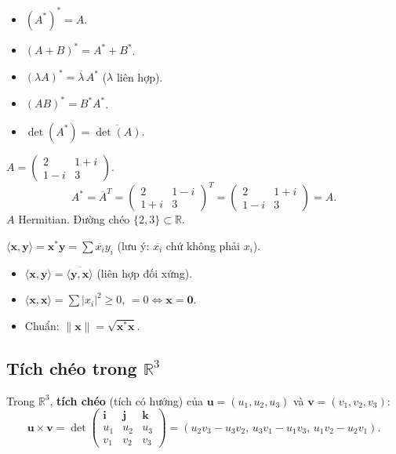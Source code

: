 \documentclass[12pt,a4paper]{article}
\begin{document}
\begin{tinhchat}[title={Tính chất $A^*$}]
\begin{itemize}
  \item $(A^*)^* = A$.
  \item $(A + B)^* = A^* + B^*$.
  \item $(\lambda A)^* = \overline{\lambda}\, A^*$ ($\lambda$ liên hợp).
  \item $(AB)^* = B^* A^*$.
  \item $\det(A^*) = \overline{\det(A)}$.
\end{itemize}
\end{tinhchat}

\begin{vidu}
$A = \begin{pmatrix}2 & 1+i\\ 1-i & 3\end{pmatrix}$.
\[
  A^* = \overline{A}^T = \begin{pmatrix}2 & 1-i\\ 1+i & 3\end{pmatrix}^T = \begin{pmatrix}2 & 1+i\\ 1-i & 3\end{pmatrix} = A.
\]
$A$ Hermitian. Đường chéo $\{2, 3\} \subset \mathbb{R}$.
\end{vidu}

\begin{congthuc}[title={Tích vô hướng Hermitian trên $\mathbb{C}^n$}]
$\langle \mathbf{x}, \mathbf{y}\rangle = \mathbf{x}^* \mathbf{y} = \sum \overline{x_i} y_i$ (lưu ý: $\overline{x_i}$ chứ không phải $x_i$).
\begin{itemize}
  \item $\langle \mathbf{x}, \mathbf{y}\rangle = \overline{\langle \mathbf{y}, \mathbf{x}\rangle}$ (liên hợp đối xứng).
  \item $\langle \mathbf{x}, \mathbf{x}\rangle = \sum |x_i|^2 \ge 0$, $= 0 \Leftrightarrow \mathbf{x} = \mathbf{0}$.
  \item Chuẩn: $\|\mathbf{x}\| = \sqrt{\mathbf{x}^* \mathbf{x}}$.
\end{itemize}
\end{congthuc}

\subsection{Tích chéo trong $\mathbb{R}^3$}

\begin{dinhnghia}
  Trong $\mathbb{R}^3$, \textbf{tích chéo} (tích có hướng) của $\mathbf{u} = (u_1, u_2, u_3)$ và $\mathbf{v} = (v_1, v_2, v_3)$:
  \[
    \mathbf{u} \times \mathbf{v} = \det\begin{pmatrix}\mathbf{i} & \mathbf{j} & \mathbf{k}\\ u_1 & u_2 & u_3\\ v_1 & v_2 & v_3\end{pmatrix} = (u_2 v_3 - u_3 v_2,\, u_3 v_1 - u_1 v_3,\, u_1 v_2 - u_2 v_1).
  \]
\end{dinhnghia}
\end{document}
